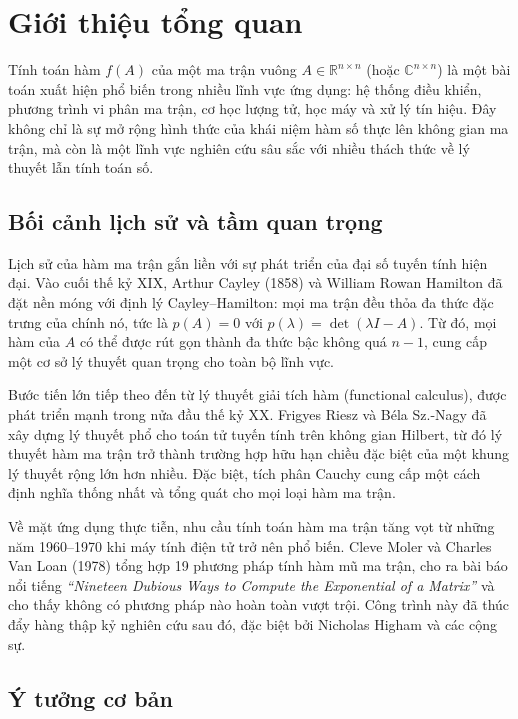 \documentclass[12pt,a4paper]{report}
\newcommand{\R}{\mathbb{R}}
\newcommand{\C}{\mathbb{C}}
\begin{document}
\chapter*{Giới thiệu tổng quan}

Tính toán hàm $f(A)$ của một ma trận vuông $A \in \R^{n \times n}$ (hoặc $\C^{n \times n}$)
là một bài toán xuất hiện phổ biến trong nhiều lĩnh vực ứng dụng: hệ thống điều khiển,
phương trình vi phân ma trận, cơ học lượng tử, học máy và xử lý tín hiệu. Đây không
chỉ là sự mở rộng hình thức của khái niệm hàm số thực lên không gian ma trận, mà còn
là một lĩnh vực nghiên cứu sâu sắc với nhiều thách thức về lý thuyết lẫn tính toán số.

\section*{Bối cảnh lịch sử và tầm quan trọng}

Lịch sử của hàm ma trận gắn liền với sự phát triển của đại số tuyến tính hiện đại.
Vào cuối thế kỷ XIX, Arthur Cayley (1858) và William Rowan Hamilton đã đặt nền móng
với định lý Cayley--Hamilton: mọi ma trận đều thỏa đa thức đặc trưng của chính nó,
tức là $p(A) = 0$ với $p(\lambda) = \det(\lambda I - A)$. Từ đó, mọi hàm của $A$ có
thể được rút gọn thành đa thức bậc không quá $n-1$, cung cấp một cơ sở lý thuyết
quan trọng cho toàn bộ lĩnh vực.

Bước tiến lớn tiếp theo đến từ lý thuyết giải tích hàm (functional calculus), được
phát triển mạnh trong nửa đầu thế kỷ XX. Frigyes Riesz và Béla Sz.-Nagy đã xây dựng
lý thuyết phổ cho toán tử tuyến tính trên không gian Hilbert, từ đó lý thuyết hàm
ma trận trở thành trường hợp hữu hạn chiều đặc biệt của một khung lý thuyết rộng
lớn hơn nhiều. Đặc biệt, tích phân Cauchy cung cấp một cách định nghĩa thống nhất
và tổng quát cho mọi loại hàm ma trận.

Về mặt ứng dụng thực tiễn, nhu cầu tính toán hàm ma trận tăng vọt từ những năm
1960--1970 khi máy tính điện tử trở nên phổ biến. Cleve Moler và Charles Van Loan
(1978) tổng hợp 19 phương pháp tính hàm mũ ma trận, cho ra bài báo nổi tiếng
\emph{``Nineteen Dubious Ways to Compute the Exponential of a Matrix''} và cho thấy
không có phương pháp nào hoàn toàn vượt trội. Công trình này đã thúc đẩy hàng thập
kỷ nghiên cứu sau đó, đặc biệt bởi Nicholas Higham và các cộng sự.

\section*{Ý tưởng cơ bản}
\end{document}
